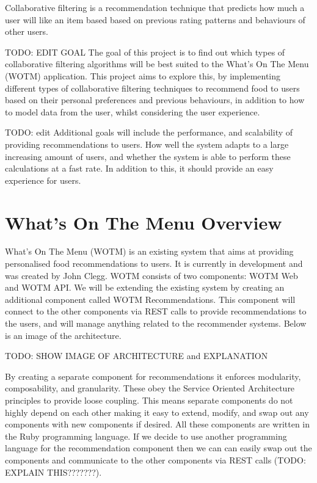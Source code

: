 Collaborative filtering is a recommendation technique that predicts how much a user will like an item based based on previous rating patterns and behaviours of other users. 

TODO: EDIT GOAL
The goal of this project is to find out which types of collaborative filtering algorithms will be best suited to the What's On The Menu (WOTM) application. This project aims to explore this, by implementing different types of collaborative filtering techniques to recommend food to users based on their personal preferences and previous behaviours, in addition to how to model data from the user, whilst considering the user experience. 

TODO: edit
Additional goals will include the performance, and scalability of providing recommendations to users. How well the system adapts to a large increasing amount of users, and whether the system is able to perform these calculations at a fast rate. In addition to this, it should provide an easy experience for users.

\section{What's On The Menu Overview}

What's On The Menu (WOTM) is an existing system that aims at providing personalised food recommendations to users. It is currently in development and was created by John Clegg. WOTM consists of two components: WOTM Web and WOTM API. We will be extending the existing system by creating an additional component called WOTM Recommendations. This component will connect to the other components via REST calls to provide recommendations to the users, and will manage anything related to the recommender systems. Below is an image of the architecture. 

TODO: SHOW IMAGE OF ARCHITECTURE and EXPLANATION

By creating a separate component for recommendations it enforces modularity, composability, and granularity. These obey the Service Oriented Architecture principles to provide loose coupling. This means separate components do not highly depend on each other making it easy to extend, modify, and swap out any components with new components if desired. All these components are written in the Ruby programming language. If we decide to use another programming language for the recommendation component then we can can easily swap out the components and communicate to the other components via REST calls (TODO: EXPLAIN THIS???????). 


